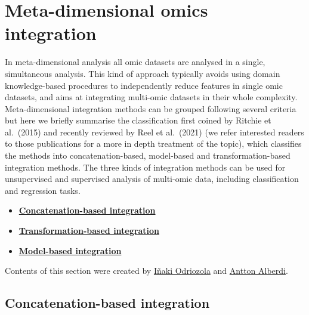 \documentclass[
]{book}
\providecommand{\tightlist}{%
  \setlength{\itemsep}{0pt}\setlength{\parskip}{0pt}}
\begin{document}
\hypertarget{meta-dimensional-omics-integration}{%
\chapter{Meta-dimensional omics integration}\label{meta-dimensional-omics-integration}}

In meta-dimensional analysis all omic datasets are analysed in a single, simultaneous analysis. This kind of approach typically avoids using domain knowledge-based procedures to independently reduce features in single omic datasets, and aims at integrating multi-omic datasets in their whole complexity. Meta-dimensional integration methods can be grouped following several criteria but here we briefly summarise the classification first coined by Ritchie et al.~(2015) \citep{Ritchie2015-qe} and recently reviewed by Reel et al.~(2021) \citep{Reel2021-wb} (we refer interested readers to those publications for a more in depth treatment of the topic), which classifies the methods into concatenation-based, model-based and transformation-based integration methods. The three kinds of integration methods can be used for unsupervised and supervised analysis of multi-omic data, including classification and regression tasks.

\begin{itemize}
\tightlist
\item
  \textbf{\protect\hyperlink{multi-staged-omics-integration-concatenation-based}{Concatenation-based integration}}
\item
  \textbf{\protect\hyperlink{multi-staged-omics-integration-transformation-based}{Transformation-based integration}}
\item
  \textbf{\protect\hyperlink{multi-staged-omics-integration-model-based}{Model-based integration}}
\end{itemize}

Contents of this section were created by \protect\hyperlink{inaki-odriozola}{Iñaki Odriozola} and \protect\hyperlink{antton-alberdi}{Antton Alberdi}.

\hypertarget{multi-staged-omics-integration-concatenation-based}{%
\section{Concatenation-based integration}\label{multi-staged-omics-integration-concatenation-based}}
\end{document}
